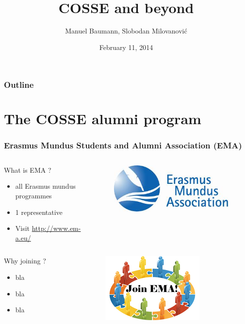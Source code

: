 \documentclass{beamer}
\title{\huge{COSSE and beyond}}
\author{Manuel Baumann, Slobodan Milovanovi\'{c}}
\date{February 11, 2014}
\institute{Joint COSSE workshop 2014 @ TU Berlin}
\begin{document}
\frame{\titlepage}
\begin{frame}
\frametitle{Outline}
\tableofcontents
\end{frame}


\section{The COSSE alumni program}
\begin{frame}
\frametitle{Erasmus Mundus Students and Alumni Association (EMA)}
\begin{columns}
\begin{column}{0.65\textwidth}
What is EMA ?
\begin{itemize}
 \item all Erasmus mundus programmes
 \item 1 representative
 \item Visit \href{http://www.em-a.eu/}{http://www.em-a.eu/} 
\end{itemize}
\end{column}
\begin{column}{0.35\textwidth}
\begin{figure}
\centering
\vspace{-0.6cm}
\includegraphics[scale=0.3]{images/ema.jpeg}
\end{figure}
\end{column}
\end{columns}
\pause
\vspace{1cm}
\begin{columns}
\begin{column}{0.65\textwidth}
Why joining ?
\begin{itemize}
 \item bla
 \item bla
 \item bla
\end{itemize}
\end{column}
\begin{column}{0.35\textwidth}
\begin{figure}
\centering
\includegraphics[scale=1.5]{images/joinEMA.jpg}
\end{figure}
\end{column}
\end{columns}
\end{frame}
\end{document}
